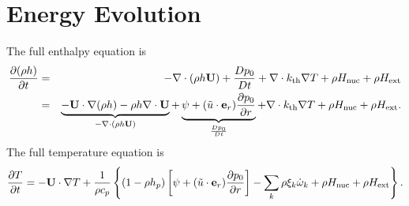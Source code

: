 \section{Energy Evolution}
The full enthalpy equation is
\begin{eqnarray}
\frac{\partial(\rho h)}{\partial t} &=& -\nabla\cdot(\rho h {\bf U}) + \frac{Dp_0}{Dt} 
+ \nabla\cdot k_{\rm th} \nabla T + \rho H_{\rm nuc} + \rho H_{\rm ext} \nonumber \\
&=& \underbrace{-{\bf U}\cdot\nabla(\rho h) - \rho h\nabla\cdot{\bf U}}_{-\nabla\cdot(\rho h{\bf U})} 
+ \underbrace{\psi + (\tilde{u} \cdot \mathbf{e}_r) \frac{\partial p_0}{\partial r}}_{\frac{Dp_0}{Dt}} 
+ \nabla\cdot k_{\rm th}\nabla T + \rho H_{\rm nuc} + \rho H_{\rm ext}.
\end{eqnarray}
The full temperature equation is
\begin{equation}
\frac{\partial T}{\partial t} = -{\bf U}\cdot\nabla T
+ \frac{1}{\rho c_p}\left\{(1-\rho h_p)\left[\psi
+ (\tilde{u} \cdot \mathbf{e}_r )\frac{\partial p_0}{\partial r}\right] - \sum_k\rho\xi_k\dot\omega_k 
+ \rho H_{\rm nuc} + \rho H_{\rm ext}\right\}.
\end{equation}

